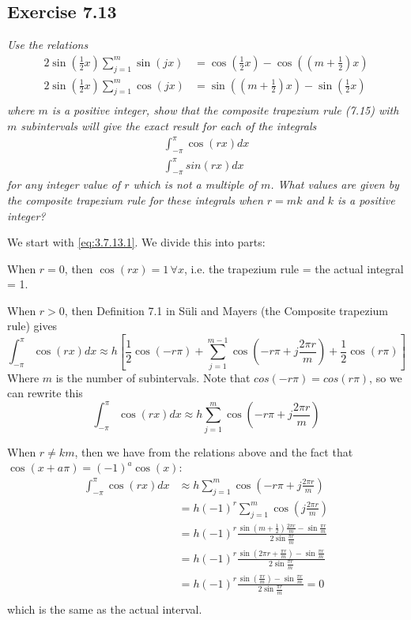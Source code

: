 \subsection{Exercise 7.13}
\textit{Use the relations}
\begin{align*}
    2 \sin\left(\frac{1}{2} x\right) \sum_{j=1}^m \sin\left(jx\right) &= \cos \left(\frac{1}{2}x \right) - \cos \left((m + \frac{1}{2}) x\right) \\
    2 \sin\left(\frac{1}{2} x\right) \sum_{j=1}^m \cos\left(jx\right) &= \sin \left((m + \frac{1}{2})x\right) - \sin \left(\frac{1}{2}x\right) \\
\end{align*}
\textit{where $m$ is a positive integer, show that the composite trapezium rule (7.15) with $m$ subintervals will give the exact result for each of the integrals}
\begin{align}
\label{eq:3.7.13.1}
    \int_{-\pi}^\pi \cos(rx) dx \\
\label{eq:3.7.13.2}
    \int_{-\pi}^\pi sin(rx) dx
\end{align}
\textit{for any integer value of $r$ which is not a multiple of $m$. What values are given by the composite trapezium rule for these integrals when $r = mk$ and $k$ is a positive integer?}

We start with \eqref{eq:3.7.13.1}. We divide this into parts:

When $r = 0$, then $\cos(rx) = 1\, \forall x$, i.e. the trapezium rule = the actual integral = 1.

When $r > 0$, then Definition 7.1 in Süli and Mayers (the Composite trapezium rule) gives
\begin{equation*}
    \int_{-\pi}^\pi \cos(rx) dx \approx h \left[ \frac{1}{2} \cos(-r\pi) + \sum_{j=1}^{m-1} \cos\left(-r\pi + j\frac{2\pi r}{m}\right) + \frac{1}{2} \cos(r\pi) \right]
\end{equation*}
Where $m$ is the number of subintervals. Note that $cos(-r\pi) = cos(r\pi)$, so we can rewrite this
\begin{equation*}
    \int_{-\pi}^\pi \cos(rx) dx \approx h \sum_{j=1}^{m} \cos\left(-r\pi + j\frac{2\pi r}{m}\right)
\end{equation*}

When $r \ne km$, then we have from the relations above and the fact that $\cos(x + a\pi) = (-1)^a\cos(x)$:
\begin{align*}
    \int_{-\pi}^\pi \cos(rx) dx &\approx h \sum_{j=1}^{m} \cos\left(-r\pi + j\frac{2\pi r}{m}\right) \\
    &= h (-1)^r \sum_{j=1}^m \cos\left(j\frac{2\pi r}{m}\right) \\
    &= h(-1)^r \frac{\sin(m + \frac{1}{2})\frac{2\pi r}{m} - \sin \frac{\pi r}{m}}{2 \sin \frac{\pi r}{m}} \\
    &= h(-1)^r \frac{\sin(2\pi r + \frac{\pi r}{m}) - \sin \frac{\pi r}{m}}{2 \sin\frac{\pi r}{m}} \\
    &= h(-1)^r \frac{\sin(\frac{\pi r}{m}) - \sin \frac{\pi r}{m}}{2 \sin\frac{\pi r}{m}} = 0\\
\end{align*}
which is the same as the actual interval.

